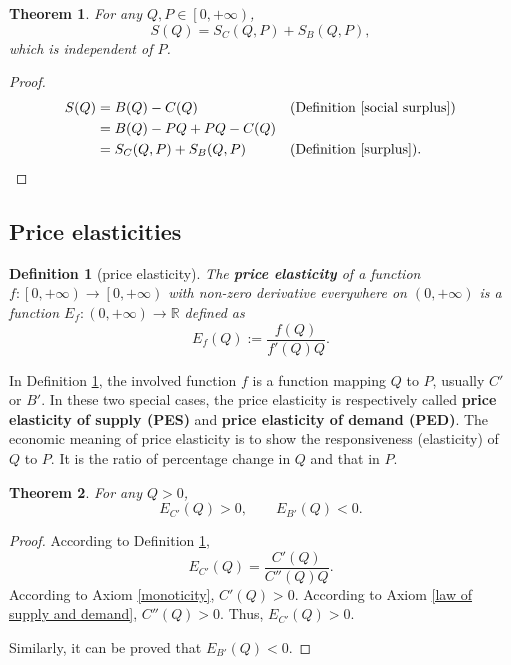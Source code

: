\documentclass{article}
\newtheorem{theorem}{Theorem}[subsection]
\newtheorem{definition}{Definition}[subsection]
\begin{document}
\begin{theorem}
For any $Q,P\in\left[0,+\infty\right)$,
$$S\!\left(Q\right)=S_C\!\left(Q,P\right)+S_B\!\left(Q,P\right),$$
which is independent of $P$.
\end{theorem}
\begin{proof}
\begin{align*}
S\!\left(Q\right)&=B\!\left(Q\right)-C\!\left(Q\right)&&\text{(Definition \ref{social surplus})}\\
&=B\!\left(Q\right)-PQ+PQ-C\!\left(Q\right)\\
&=S_C\!\left(Q,P\right)+S_B\!\left(Q,P\right)&&\text{(Definition \ref{surplus})}.
\end{align*}
\end{proof}

\subsection{Price elasticities}

\begin{definition}[price elasticity]
\label{price elasticity}
The \textbf{price elasticity} of a function $f:\left[0,+\infty\right)\to\left[0,+\infty\right)$ with non-zero derivative everywhere on $\left(0,+\infty\right)$
is a function $E_f:\left(0,+\infty\right)\to\mathbb R$ defined as
$$E_f\!\left(Q\right):=\frac{f\!\left(Q\right)}{f'\!\left(Q\right)Q}.$$
\end{definition}

In Definition \ref{price elasticity}, the involved function $f$ is a function mapping $Q$ to $P$, usually $C'$ or $B'$.
In these two special cases, the price elasticity is respectively called \textbf{price elasticity of supply (PES)} and \textbf{price elasticity of demand (PED)}.
The economic meaning of price elasticity is to show the responsiveness (elasticity) of $Q$ to $P$.
It is the ratio of percentage change in $Q$ and that in $P$.

\begin{theorem}
\label{sign of price elasticity}
For any $Q>0$,
$$E_{C'}\!\left(Q\right)>0,
\qquad E_{B'}\!\left(Q\right)<0.$$
\end{theorem}
\begin{proof}
According to Definition \ref{price elasticity},
$$E_{C'}\!\left(Q\right)=\frac{C'\!\left(Q\right)}{C''\!\left(Q\right)Q}.$$
According to Axiom \ref{monoticity}, $C'\!\left(Q\right)>0$.
According to Axiom \ref{law of supply and demand}, $C''\!\left(Q\right)>0$.
Thus, $E_{C'}\!\left(Q\right)>0$.

Similarly, it can be proved that $E_{B'}\!\left(Q\right)<0$.
\end{proof}
\end{document}
